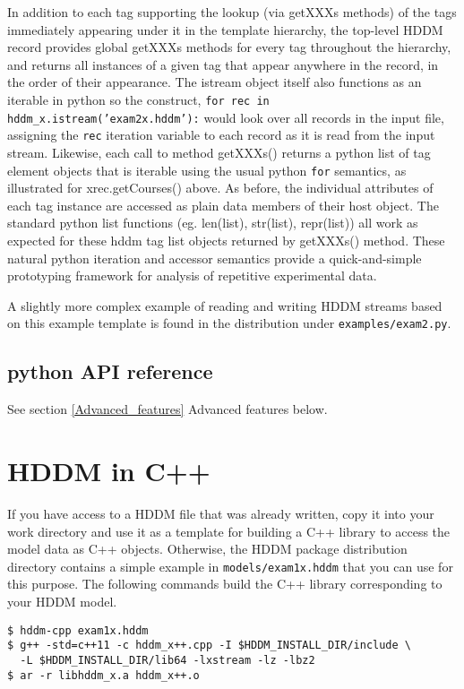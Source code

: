 \documentclass{revtex4}
\begin{document}
In addition to each tag supporting the lookup (via getXXXs methods) of the
tags immediately appearing under it in the template hierarchy, the 
top-{}level HDDM record provides global getXXXs methods for every tag
throughout the hierarchy, and returns all instances of a given tag that
appear anywhere in the record, in the order of their appearance. The
istream object itself also functions as an iterable in python so the
construct, \texttt{for rec in hddm\_x.istream('exam2x.hddm'):} would
look over all records in the input file, assigning the \texttt{rec}
iteration variable to each record as it is read from the input stream.
Likewise, each call to method getXXXs() returns a python list of tag
element objects that is iterable using the usual python \texttt{for}
semantics, as illustrated for xrec.getCourses() above. As before, the
individual attributes of each tag instance are accessed as plain data 
members of their host object. The standard python list functions (eg.
len(list), str(list), repr(list)) all work as expected for these hddm
tag list objects returned by getXXXs() method. These natural python
iteration and accessor semantics provide a quick-{}and-{}simple
prototyping framework for analysis of repetitive experimental data.

A slightly more complex example of reading and writing HDDM streams
based on this example template is found in the distribution under
\texttt{examples/exam2.py}.

\subsection{python API reference}

See section \ref{Advanced_features} {Advanced features} below.

\section{HDDM in C++}

If you have access to a HDDM file that was already written, copy it into your
work directory and use it as a template for building a C++ library to access
the model data as C++ objects. Otherwise, the HDDM package distribution
directory contains a simple example in \texttt{models/exam1x.hddm} that you
can use for this purpose. The following commands build the C++ library
corresponding to your HDDM model.

\vspace{0.5cm}
\begin{minipage}{12cm}
\begin{verbatim}
$ hddm-cpp exam1x.hddm
$ g++ -std=c++11 -c hddm_x++.cpp -I $HDDM_INSTALL_DIR/include \
  -L $HDDM_INSTALL_DIR/lib64 -lxstream -lz -lbz2
$ ar -r libhddm_x.a hddm_x++.o
\end{verbatim}
\end{minipage}
\vspace{0.5cm}
\end{document}
